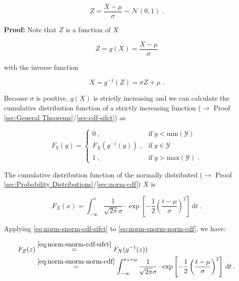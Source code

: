 \documentclass[a4paper,12pt,twoside]{book}
\begin{document}
\begin{equation} \label{eq:norm-snorm-Z-snorm}
Z = \frac{X-\mu}{\sigma} \sim \mathcal{N}(0, 1) \; .
\end{equation}


\vspace{1em}
\textbf{Proof:} Note that $Z$ is a function of $X$

\begin{equation} \label{eq:norm-snorm-Z-X}
Z = g(X) = \frac{X-\mu}{\sigma}
\end{equation}

with the inverse function

\begin{equation} \label{eq:norm-snorm-X-Z}
X = g^{-1}(Z) = \sigma Z + \mu \; .
\end{equation}

Because $\sigma$ is positive, $g(X)$ is strictly increasing and we can calculate the cumulative distribution function of a strictly increasing function ($\rightarrow$ Proof \ref{sec:General Theorems}/\ref{sec:cdf-sifct}) as

\begin{equation} \label{eq:norm-snorm-cdf-sifct}
F_Y(y) = \left\{
\begin{array}{rl}
0 \; , & \text{if} \; y < \mathrm{min}(\mathcal{Y}) \\
F_X(g^{-1}(y)) \; , & \text{if} \; y \in \mathcal{Y} \\
1 \; , & \text{if} \; y > \mathrm{max}(\mathcal{Y}) \; .
\end{array}
\right.
\end{equation}

The cumulative distribution function of the normally distributed ($\rightarrow$ Proof \ref{sec:Probability Distributions}/\ref{sec:norm-cdf}) $X$ is

\begin{equation} \label{eq:norm-snorm-norm-cdf}
F_X(x) = \int_{-\infty}^{x} \frac{1}{\sqrt{2 \pi} \sigma} \cdot \exp \left[ -\frac{1}{2} \left( \frac{t-\mu}{\sigma} \right)^2 \right] \, \mathrm{d}t \; .
\end{equation}

Applying \eqref{eq:norm-snorm-cdf-sifct} to \eqref{eq:norm-snorm-norm-cdf}, we have:

\begin{equation} \label{eq:norm-snorm-Z-cdf-s1}
\begin{split}
F_Z(z) &\overset{\eqref{eq:norm-snorm-cdf-sifct}}{=} F_X(g^{-1}(z)) \\
&\overset{\eqref{eq:norm-snorm-norm-cdf}}{=} \int_{-\infty}^{\sigma z + \mu} \frac{1}{\sqrt{2 \pi} \sigma} \cdot \exp \left[ -\frac{1}{2} \left( \frac{t-\mu}{\sigma} \right)^2 \right] \, \mathrm{d}t \; .
\end{split}
\end{equation}
\end{document}
